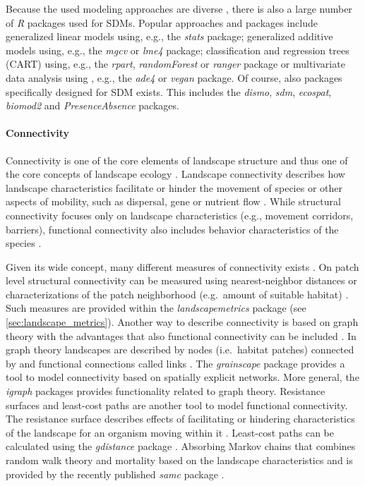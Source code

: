 \documentclass[smallextended]{svjour3}       %
\begin{document}
Because the used modeling approaches are diverse
\cite{Hooten2011,Kerr2011,Fletcher2019}, there is also a large number of
\emph{R} packages used for SDMs. Popular approaches and packages include
generalized linear models using, e.g., the \emph{stats} package;
generalized additive models using, e.g., the \emph{mgcv} or \emph{lme4}
package; classification and regression trees (CART) using, e.g., the
\emph{rpart}, \emph{randomForest} or \emph{ranger} package or
multivariate data analysis using , e.g., the \emph{ade4} or \emph{vegan}
package. Of course, also packages specifically designed for SDM exists.
This includes the \emph{dismo}, \emph{sdm}, \emph{ecospat},
\emph{biomod2} and \emph{PresenceAbsence} packages.

\hypertarget{sec:connectivity}{%
\paragraph{Connectivity}\label{sec:connectivity}}

Connectivity is one of the core elements of landscape structure
\cite{Taylor1993} and thus one of the core concepts of landscape ecology
\cite{With2019}. Landscape connectivity describes how landscape
characteristics facilitate or hinder the movement of species
\cite{Tischendorf2000} or other aspects of mobility, such as dispersal,
gene or nutrient flow \cite{With2019}. While structural connectivity
focuses only on landscape characteristics (e.g., movement corridors,
barriers), functional connectivity also includes behavior
characteristics of the species \cite{Tischendorf2000,With2019}.

Given its wide concept, many different measures of connectivity exists
\cite{Kindlmann2008}. On patch level structural connectivity can be
measured using nearest-neighbor distances or characterizations of the
patch neighborhood (e.g.~amount of suitable habitat)
\cite{Kindlmann2008,With2019}. Such measures are provided within the
\emph{landscapemetrics} package (see \ref{sec:landscape_metrics}).
Another way to describe connectivity is based on graph theory with the
advantages that also functional connectivity can be included
\cite{Kindlmann2008}. In graph theory \cite{Laita2011} landscapes are
described by nodes (i.e.~habitat patches) connected by and functional
connections called links \cite{Laita2011}. The \emph{grainscape} package
\cite{Chubaty2020} provides a tool to model connectivity based on
spatially explicit networks. More general, the \emph{igraph} packages
\cite{Csardi2006} provides functionality related to graph theory.
Resistance surfaces and least-cost paths are another tool to model
functional connectivity. The resistance surface describes effects of
facilitating or hindering characteristics of the landscape for an
organism moving within it \cite{Adriaensen2003}. Least-cost paths can be
calculated using the \emph{gdistance} package \cite{vanEtten2017}.
Absorbing Markov chains that combines random walk theory and mortality
based on the landscape characteristics \cite{Fletcher2019a} and is
provided by the recently published \emph{samc} package \cite{Marx2020}.
\end{document}
